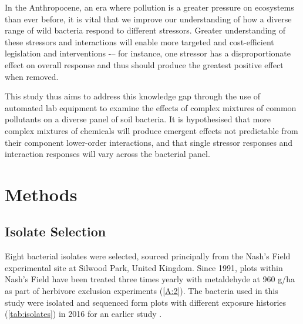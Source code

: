 \documentclass[final,1p,times]{elsarticle}
\begin{document}
In the Anthropocene, an era where pollution is a greater pressure on ecosystems than ever before, it is vital that we improve our understanding of how a diverse range of wild bacteria respond to different stressors. Greater understanding of these stressors and interactions will enable more targeted and cost-efficient legislation and interventions -– for instance, one stressor has a disproportionate effect on overall response and thus should produce the greatest positive effect when removed. 

This study thus aims to address this knowledge gap through the use of automated lab equipment to examine the effects of complex mixtures of common pollutants on a diverse panel of soil bacteria. It is hypothesised that more complex mixtures of chemicals will produce emergent effects not predictable from their component lower-order interactions, and that single stressor responses and interaction responses will vary across the bacterial panel.

\section{Methods}
\label{S:2}
\subsection{Isolate Selection}
\label{S:2:1}

Eight bacterial isolates were selected, sourced principally from the Nash's Field experimental site at Silwood Park, United Kingdom. Since 1991, plots within Nash's Field have been treated three times yearly with metaldehyde at 960 g/ha as part of herbivore exclusion experiments \cite{Allan2011ContrastingExperiment} (\cref{A:2}). The bacteria used in this study were isolated and sequenced form plots with different exposure histories (\cref{tab:isolates}) in 2016 for an earlier study \cite{Mombrikotb2016}. 
\end{document}
